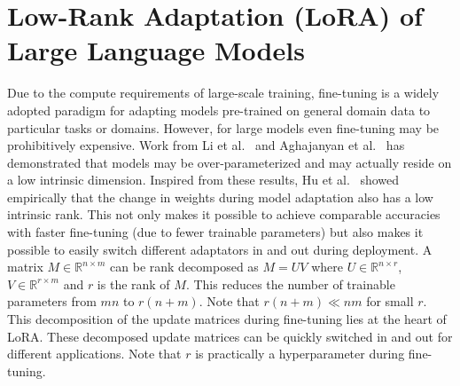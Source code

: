\documentclass{article}
\newcommand{\R}{\mathbb{R}}
\begin{document}
\section{Low-Rank Adaptation (LoRA) of Large Language Models} \label{lora}
Due to the compute requirements of large-scale training, fine-tuning is a widely adopted paradigm for adapting models pre-trained on general domain data to particular tasks or domains. However, for large models even fine-tuning may be prohibitively expensive. Work from Li et al.~\cite{li2018measuring} and Aghajanyan et al.~\cite{aghajanyan2020intrinsic} has demonstrated that models may be over-parameterized and may actually reside on a low intrinsic dimension. Inspired from these results, Hu et al.~\cite{hu2022lora} showed empirically that the change in weights during model adaptation also has a low intrinsic rank. This not only makes it possible to achieve comparable accuracies with faster fine-tuning (due to fewer trainable parameters) but also makes it possible to easily switch different adaptators in and out during deployment. A matrix $M \in \R^{n \times m}$ can be rank decomposed as $M = UV$ where $U \in \R^{n \times r}$, $V \in \R^{r \times m}$ and $r$ is the rank of $M$. This reduces the number of trainable parameters from $mn$ to $r(n + m)$. Note that $r(n + m) \ll nm$ for small $r$. This decomposition of the update matrices during fine-tuning lies at the heart of LoRA. These decomposed update matrices can be quickly switched in and out for different applications. Note that $r$ is practically a hyperparameter during fine-tuning.
\end{document}
